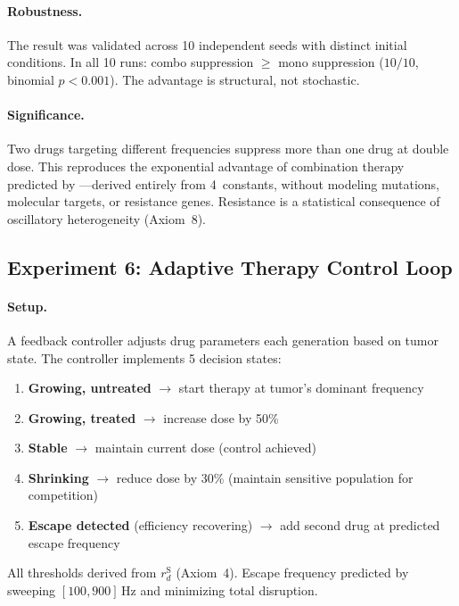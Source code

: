 \documentclass[11pt,a4paper]{article}
\begin{document}
\paragraph{Robustness.}
The result was validated across 10 independent seeds
with distinct initial conditions. In all 10 runs:
combo suppression $\geq$ mono suppression ($10/10$,
binomial $p < 0.001$). The advantage is structural,
not stochastic.

\paragraph{Significance.}
Two drugs targeting different frequencies suppress more
than one drug at double dose. This reproduces the
exponential advantage of combination therapy predicted
by \citet{bozic2013evolutionary}---derived entirely from
4~constants, without modeling mutations, molecular targets,
or resistance genes. Resistance is a statistical consequence
of oscillatory heterogeneity (Axiom~8).

\subsection{Experiment 6: Adaptive Therapy Control Loop}

\paragraph{Setup.}
A feedback controller adjusts drug parameters each generation
based on tumor state. The controller implements 5 decision states:

\begin{enumerate}
  \item \textbf{Growing, untreated} $\to$ start therapy at tumor's
        dominant frequency
  \item \textbf{Growing, treated} $\to$ increase dose by 50\%
  \item \textbf{Stable} $\to$ maintain current dose (control achieved)
  \item \textbf{Shrinking} $\to$ reduce dose by 30\%
        (maintain sensitive population for competition)
  \item \textbf{Escape detected} (efficiency recovering) $\to$
        add second drug at predicted escape frequency
\end{enumerate}

All thresholds derived from $r_d^{\text{S}}$ (Axiom~4).
Escape frequency predicted by sweeping $[100, 900]$\,Hz
and minimizing total disruption.
\end{document}
